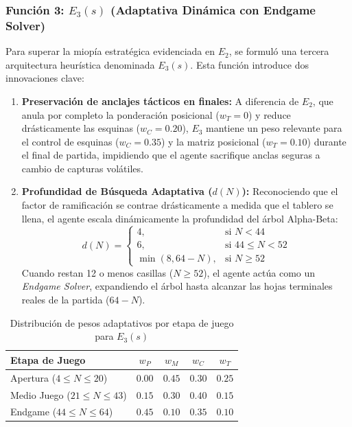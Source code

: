 \documentclass[10pt,a4paper]{article}
\begin{document}
\subsubsection{Función 3: \texorpdfstring{$E_3(s)$}{E3(s)} (Adaptativa Dinámica con Endgame Solver)}
Para superar la miopía estratégica evidenciada en $E_2$, se formuló una tercera arquitectura heurística denominada $E_3(s)$. Esta función introduce dos innovaciones clave:
\begin{enumerate}
    \item \textbf{Preservación de anclajes tácticos en finales:} A diferencia de $E_2$, que anula por completo la ponderación posicional ($w_T = 0$) y reduce drásticamente las esquinas ($w_C = 0.20$), $E_3$ mantiene un peso relevante para el control de esquinas ($w_C = 0.35$) y la matriz posicional ($w_T = 0.10$) durante el final de partida, impidiendo que el agente sacrifique anclas seguras a cambio de capturas volátiles.
    \item \textbf{Profundidad de Búsqueda Adaptativa ($d(N)$):} Reconociendo que el factor de ramificación se contrae drásticamente a medida que el tablero se llena, el agente escala dinámicamente la profundidad del árbol Alpha-Beta:
    \begin{equation}
        d(N) = 
        \begin{cases}
            4, & \text{si } N < 44 \\
            6, & \text{si } 44 \le N < 52 \\
            \min(8, 64 - N), & \text{si } N \ge 52
        \end{cases}
    \end{equation}
    Cuando restan 12 o menos casillas ($N \ge 52$), el agente actúa como un \textit{Endgame Solver}, expandiendo el árbol hasta alcanzar las hojas terminales reales de la partida ($64 - N$).
\end{enumerate}

\begin{table}[h]
    \centering
    \caption{Distribución de pesos adaptativos por etapa de juego para $E_3(s)$}
    \label{tab:pesos_e3}
    \begin{tabular}{lcccc}
        \toprule
        \textbf{Etapa de Juego} & $w_P$ & $w_M$ & $w_C$ & $w_T$ \\
        \midrule
        Apertura ($4 \le N \le 20$) & $0.00$ & $0.45$ & $0.30$ & $0.25$ \\
        Medio Juego ($21 \le N \le 43$) & $0.15$ & $0.30$ & $0.40$ & $0.15$ \\
        Endgame ($44 \le N \le 64$) & $0.45$ & $0.10$ & $0.35$ & $0.10$ \\
        \bottomrule
    \end{tabular}
\end{table}
\end{document}

